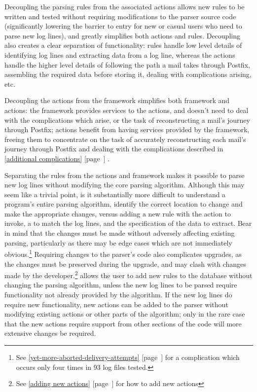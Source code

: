 \documentclass[a4paper,12pt,draft]{article}
\newcommand{\parsername}{\PLP{}}
\newcommand{\refwithpage}[1]{%
    \empty{}\ref{#1} [page~\pageref{#1}]%
}
\newcommand{\sectionref}[1]{%
    \textsection{}\refwithpage{#1}%
}
\newcommand{\numberOFlogFILES}[0]{%
    93%
}
\begin{document}
Decoupling the parsing rules from the associated actions allows new rules
to be written and tested without requiring modifications to the parser
source code (significantly lowering the barrier to entry for new or casual
users who need to parse new log lines), and greatly simplifies both actions
and rules.  Decoupling also creates a clear separation of functionality:
rules handle low level details of identifying log lines and extracting data
from a log line, whereas the actions handle the higher level details of
following the path a mail takes through Postfix, assembling the required
data before storing it, dealing with complications arising, etc.

Decoupling the actions from the framework simplifies both framework and
actions: the framework provides services to the actions, and doesn't need
to deal with the complications which arise, or the task of reconstructing a
mail's journey through Postfix; actions benefit from having services
provided by the framework, freeing them to concentrate on the task of
accurately reconstructing each mail's journey through Postfix and dealing
with the complications described in \sectionref{additional complications}.

Separating the rules from the actions and framework makes it possible to
parse new log lines without modifying the core parsing algorithm.  Although
this may seem like a trivial point, is it substantially more difficult to
understand a program's entire parsing algorithm, identify the correct
location to change and make the appropriate changes, versus adding a new
rule with the action to invoke, a \regex{} to match the log lines, and the
specification of the data to extract.  Bear in mind that the changes must
be made without adversely affecting existing parsing, particularly as there
may be edge cases which are not immediately obvious.\footnote{See
\sectionref{yet-more-aborted-delivery-attempts} for a complication which
occurs only four times in \numberOFlogFILES{} log files tested.}  Requiring
changes to the parser's code also complicates upgrades, as the changes
must be preserved during the upgrade, and may clash with changes made by
the developer.\footnote{See \sectionref{adding new actions} for how to add
new actions}  \parsername{} allows the user to add new rules to the
database without changing the parsing algorithm, unless the new log lines
to be parsed require functionality not already provided by the algorithm.
If the new log lines do require new functionality, new actions can be added
to the parser without modifying existing actions or other parts of the
algorithm; only in the rare case that the new actions require support from
other sections of the code will more extensive changes be required.
\end{document}
